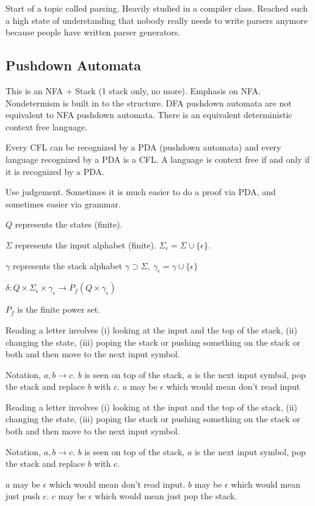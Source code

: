 \documentclass[../598comp.tex]{subfiles}
\begin{document}
Start of a topic called parsing. Heavily studied in a compiler class. Reached
such a high state of understanding that nobody really needs to write parsers
anymore because people have written parser generators.

\subsection{Pushdown Automata}

This is an NFA + Stack (1 stack only, no more). Emphasis on NFA. Nondetermism is
built in to the structure. DFA pushdown automata are not equivalent to NFA
pushdown automata. There is an equivalent deterministic context free language.

\begin{theorem}
  Every CFL can be recognized by a PDA (pushdown automata) and every language
  recognized by a PDA is a CFL. A language is context free if and only if it is
  recognized by a PDA.
  
  Use judgement. Sometimes it is much easier to do a proof via PDA, and
  sometimes easier via grammar.
\end{theorem}

\begin{definition}
  $Q$ represents the states (finite).

  $\Sigma$ represents the input alphabet (finite). $\Sigma_\epsilon = \Sigma
  \cup \{\epsilon\}$.

  $\gamma$ represents the stack alphabet $\gamma \supset \Sigma, \
  \gamma_\epsilon = \gamma \cup \{\epsilon\}$

  $\delta: Q \times \Sigma_\epsilon \times \gamma_\epsilon \to P_f(Q \times \gamma_\epsilon)$ 

  $P_f$ is the finite power set.

  Reading a letter involves (i) looking at the input and the top of the stack,
  (ii) changing the state, (iii) poping the stack or pushing something on the
  stack or both and then move to the next input symbol.

  Notation, $a, b \to c$. $b$ is seen on top of the stack, $a$ is the next input
  symbol, pop the stack and replace $b$ with $c$. $a$ may be $\epsilon$ which
  would mean don't read input
  
  Reading a letter involves (i) looking at the input and the top of the stack,
  (ii) changing the state, (iii) poping the stack or pushing something on the
  stack or both and then move to the next input symbol.
  
  Notation, $a, b \to c$. $b$ is seen on top of the stack, $a$ is the next input
  symbol, pop the stack and replace $b$ with $c$.
  
  $a$ may be $\epsilon$ which would mean don't read input. $b$ may be $\epsilon$
  which would mean just push $c$. $c$ may be $\epsilon$ which would mean just pop
  the stack.
\end{definition}
\end{document}
